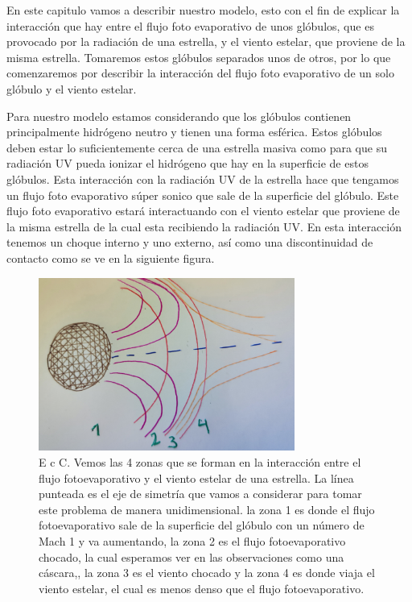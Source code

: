 \documentclass{book}
\begin{document}
En este capitulo vamos  a describir nuestro modelo, esto con el fin de explicar la interacción que hay entre el flujo foto evaporativo de unos glóbulos, que es provocado por la radiación de una estrella, y el viento estelar, que proviene de la misma estrella. Tomaremos estos glóbulos separados unos de otros, por lo que comenzaremos por describir la interacción del flujo foto evaporativo de un solo glóbulo y el viento estelar.

Para nuestro modelo estamos considerando que los glóbulos contienen principalmente hidrógeno neutro y tienen una forma esférica. Estos glóbulos deben estar lo suficientemente cerca de una estrella masiva como para que su radiación UV pueda ionizar el hidrógeno que hay en la superficie de estos glóbulos. Esta interacción con la radiación UV de la estrella hace que tengamos un flujo foto evaporativo súper sonico que sale de la superficie del glóbulo. Este flujo foto evaporativo estará interactuando con el viento estelar que proviene de la misma estrella de la cual esta recibiendo la radiación UV. En esta interacción tenemos un choque interno y uno externo, así como una discontinuidad de contacto como se ve en la siguiente figura.

\begin{figure}[h]
    \centering
    \includegraphics[width=0.75\textwidth]{Chp2_Zone.jpg}
    \caption{E c C.
    Vemos las 4 zonas que se forman en la interacción entre el flujo fotoevaporativo y el viento estelar de una estrella. La línea punteada es el eje de simetría que vamos a considerar para tomar este problema de manera unidimensional. la zona 1 es donde el flujo fotoevaporativo sale de la superficie del glóbulo con un número de Mach 1 y va aumentando, la zona 2 es el flujo fotoevaporativo chocado, la cual esperamos ver en las observaciones como una cáscara,, la zona 3 es el viento chocado y la zona 4 es donde viaja el viento estelar, el cual es menos denso que el flujo fotoevaporativo.}
    \label{fig:zones}
\end{figure}
\end{document}

